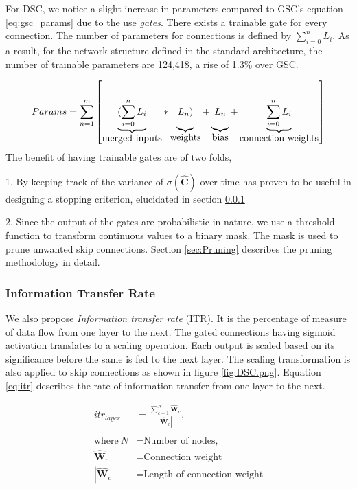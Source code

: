 \documentclass{article}
\let\oldhat\hat
\renewcommand{\hat}[1]{\oldhat{\mathbf{#1}}}
\begin{document}
For DSC, we notice a slight increase in parameters compared to GSC's equation \ref{eq:gsc_params} due to the use \emph{gates}. There exists a trainable gate for every connection. The number of parameters for connections is defined by $\sum_{i=0}^{n}L_{i}$. As a result, for the network structure defined in the standard architecture, the number of trainable parameters are 124,418, a rise of 1.3\% over GSC.

\begin{equation}
\label{eq:dsc_params}
Params= \sum_{n=1}^{m}\left[
\underbrace{(\sum_{i=0}^{n}L_{i}\rule[-12pt]{0pt}{5pt}}_{\mbox{merged inputs}}
*\underbrace{L_{n})\rule[-12pt]{0pt}{5pt}}_{\mbox{weights}}
+\underbrace{L_{n}\rule[-12pt]{0pt}{5pt}}_{\mbox{bias}}
+\underbrace{\sum_{i=0}^{n}L_{i}\rule[-12pt]{0pt}{5pt}}_{\mbox{connection weights}}\right]
\end{equation}
The benefit of having trainable gates are of two folds,

1. By keeping track of the variance of $\sigma{(\hat{C})}$ over time has proven to be useful in designing a stopping criterion, elucidated in section \ref{sub:InfoTransfer}

2. Since the output of the gates are probabilistic in nature, we use a threshold function to transform continuous values to a binary mask. The mask is used to prune unwanted skip connections. Section \ref{sec:Pruning} describes the pruning methodology in detail.




\subsubsection{Information Transfer Rate}
\label{sub:InfoTransfer}
We also propose \emph{Information transfer rate} (ITR). It is the percentage of measure of data flow from one layer to the next. The gated connections having sigmoid activation translates to a scaling operation. Each output is scaled based on its significance before the same is fed to the next layer. The scaling transformation is also applied to skip connections as shown in figure \ref{fig:DSC.png}. Equation \ref{eq:itr} describes the rate of information transfer from one layer to the next. 

    \begin{equation}
    \label{eq:itr}
    \begin{aligned}
    itr_{layer} &=\frac{\sum_{c=1}^{N}\hat{W}_{c}}{|\hat{W}_{c}|}, \\
    \\
    \text{where}~N &= \text{Number of nodes,} \\
    \hat{W}_{c} &= \text{Connection weight}\\
    |\hat{W}_{c}| &= \text{Length of connection weight}\\
\end{aligned}
\end{equation}
\end{document}
